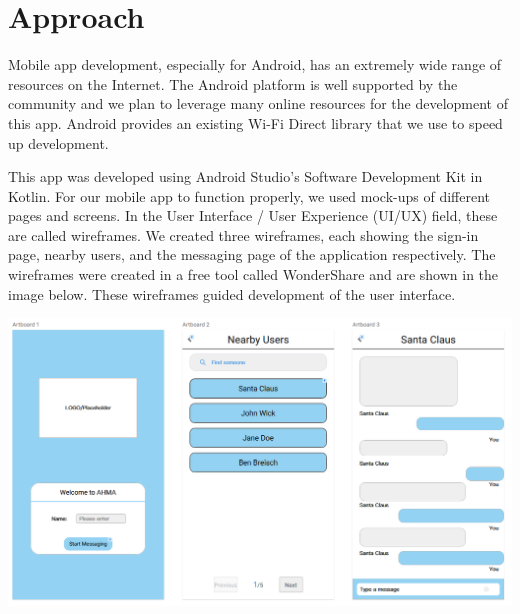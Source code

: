 \documentclass[10pt]{article}
\begin{document}

\section{Approach} %

Mobile app development, especially for Android, has an extremely wide range of resources on the Internet. The Android platform is well supported by the community and we plan to leverage many online resources for the development of this app. Android provides an existing Wi-Fi Direct library that we use to speed up development.

This app was developed using Android Studio's Software Development Kit in Kotlin. For our mobile app to function properly, we used mock-ups of different pages and screens. In the User Interface / User Experience (UI/UX) field, these are called wireframes. We created three wireframes, each showing the sign-in page, nearby users, and the messaging page of the application respectively. The wireframes were created in a free tool called WonderShare and are shown in the image below. These wireframes guided development of the user interface.


\begin{center}
    \includegraphics[scale=0.5]{wireframe.png} \\
\end{center}
\end{document}
